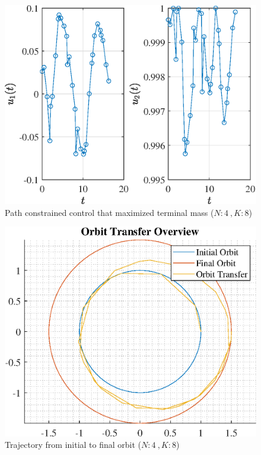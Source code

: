 \documentclass[]{article}
\begin{document}
\begin{figure}
	\centering
	\includegraphics[scale=0.75]{path_N4_K8_C3_mf.eps}
	\caption{Path constrained control that maximized terminal mass (\(N:4\ , K:8\))}
	\label{fig:path_N4_K8_C3_mf}
\end{figure}
\begin{figure}
	\centering
	\includegraphics[scale=0.75]{orbit_N4_K8_C3_mf.eps}
	\caption{Trajectory from initial to final orbit (\(N:4\ , K:8\))}
	\label{fig:orbit_N4_K8_C3_mf}
\end{figure}
\end{document}
